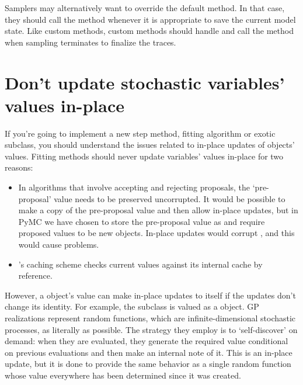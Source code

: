 Samplers may alternatively want to override the default  method. In that case, they should call the  method whenever it is appropriate to save the current model state. Like custom  methods, custom  methods should handle  and call the  method when sampling terminates to finalize the traces.

\hypertarget{dont-update-indepth}{}
\section*{Don't update stochastic variables' values in-place} \label{dont-update-indepth}

If you're going to implement a new step method, fitting algorithm or exotic  subclass, you should understand the issues related to in-place updates of  objects' values. Fitting methods should never update variables' values in-place for two reasons:
\begin{itemize}
   \item In algorithms that involve accepting and rejecting proposals, the `pre-proposal' value needs to be preserved uncorrupted. It would be possible to make a copy of the pre-proposal value and then allow in-place updates, but in PyMC we have chosen to store the pre-proposal value as  and require proposed values to be new objects. In-place updates would corrupt , and this would cause problems.
   \item {}'s caching scheme checks current values against its internal cache by reference.
\end{itemize}

However, a  object's value can make in-place updates to itself if the updates don't change its identity. For example, the  subclass  is valued as a  object. GP realizations represent random functions, which are infinite-dimensional stochastic processes, as literally as possible. The strategy they employ is to `self-discover' on demand: when they are evaluated, they generate the required value conditional on previous evaluations and then make an internal note of it. This is an in-place update, but it is done to provide the same behavior as a single random function whose value everywhere has been determined since it was created.